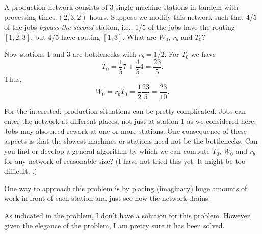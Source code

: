 \begin{question}
  A production network consists of 3 single-machine stations in tandem
  with processing times $(2, 3, 2)$ hours.  Suppose we modify this
  network such that 4/5 of the jobs \emph{bypass the second} station,
  i.e., 1/5 of the jobs have the routing $[1,2,3]$, but 4/5 have
  routing $[1,3]$.  What are $W_0$, $r_b$ and $T_0$?
\end{question}
\begin{solution}
  Now stations 1 and 3 are bottlenecks with $r_b = 1/2$. For $T_0$ we have
  \begin{equation*}
    T_0 = \frac15 7 + \frac45 4= \frac{23}5.
  \end{equation*}
Thus, 
\begin{equation*}
W_0 = r_b T_0 = \frac 12 \frac{23}5 = \frac{23}{10}.
\end{equation*}
\end{solution}




\begin{question}
  For the interested: production situations can be pretty
  complicated. Jobs can enter the network at different places, not
  just at station 1 as we considered here. Jobs may also need rework
  at one or more stations. One consequence of these aspects is that
  the slowest machines or stations need not be the bottlenecks. Can
  you find or develop a general algorithm by which we can compute
  $T_0$, $W_0$ and $r_b$ for any network of reasonable size? (I have
  not tried this yet. It might be too difficult. \tbd.) 

  One way to approach this problem is by placing (imaginary) huge
  amounts of work in front of each station and just see how the network drains. 
  \begin{solution}
    As indicated in the problem, I don't have a solution for this
    problem. However, given the elegance of the problem, I am pretty
    sure it has been solved.
  \end{solution}

\end{question}

